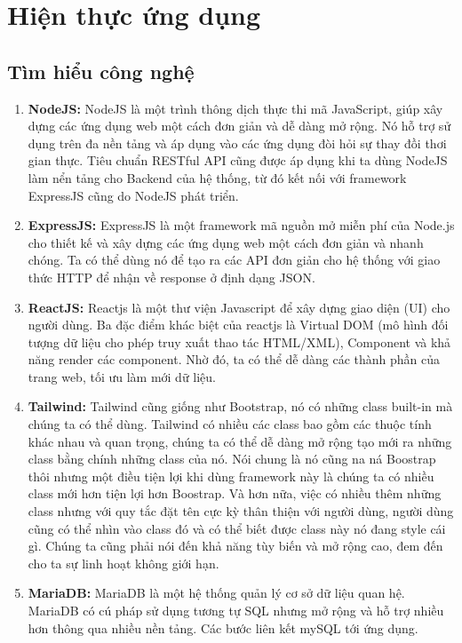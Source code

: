 \section{Hiện thực ứng dụng}
    \subsection{Tìm hiểu công nghệ}
        \begin{enumerate}
            \item \textbf{NodeJS:}
                NodeJS là một trình thông dịch thực thi mã JavaScript, giúp xây dựng các ứng dụng web một cách đơn giản và dễ dàng mở rộng. Nó hỗ trợ sử dụng trên đa nền tảng và áp dụng vào các ứng dụng đòi hỏi sự thay đồi thơi gian thực. Tiêu chuẩn RESTful API cũng được áp dụng khi ta dùng NodeJS làm nển tảng cho Backend của hệ thống, từ đó kết nối với framework ExpressJS cũng do NodeJS phát triển.

            \item \textbf{ExpressJS:}
                ExpressJS là một framework mã nguồn mở miễn phí của Node.js cho thiết kế và xây dựng các ứng dụng web một cách đơn giản và nhanh chóng. Ta có thể dùng nó để tạo ra các API đơn giản cho hệ thống với giao thức HTTP để nhận về response ở định dạng JSON.

            \item \textbf{ReactJS:}
                Reactjs là một thư viện Javascript để xây dựng giao diện (UI) cho người dùng. Ba đặc điểm khác biệt của reactjs là Virtual DOM (mô hình đối tượng dữ liệu cho phép truy xuất thao tác HTML/XML), Component và khả năng render các component. Nhờ đó, ta có thể dễ dàng các thành phần của trang web, tối ưu làm mới dữ liệu.

            \item \textbf{Tailwind:}
                Tailwind cũng giống như Bootstrap, nó có những class built-in mà chúng ta có thể dùng. Tailwind có nhiều các class bao gồm các thuộc tính khác nhau và quan trọng, chúng ta có thể dễ dàng mở rộng tạo mới ra những class bằng chính những class của nó. Nói chung là nó cũng na ná Boostrap thôi nhưng một điều tiện lợi khi dùng framework này là chúng ta có nhiều class mới hơn tiện lợi hơn Boostrap. Và hơn nữa, việc có nhiều thêm những class nhưng với quy tắc đặt tên cực kỳ thân thiện với người dùng, người dùng cũng có thể nhìn vào class đó và có thể biết được class này nó đang style cái gì. Chúng ta cũng phải nói đến khả năng tùy biến và mở rộng cao, đem đến cho ta sự linh hoạt không giới hạn.

            \item \textbf{MariaDB:}
                MariaDB là một hệ thống quản lý cơ sở dữ liệu quan hệ. MariaDB có cú pháp sử dụng tương tự SQL nhưng mở rộng và hỗ trợ nhiều hơn thông qua nhiều nền tảng. Các bước liên kết mySQL tới ứng dụng.
        \end{enumerate}
            
